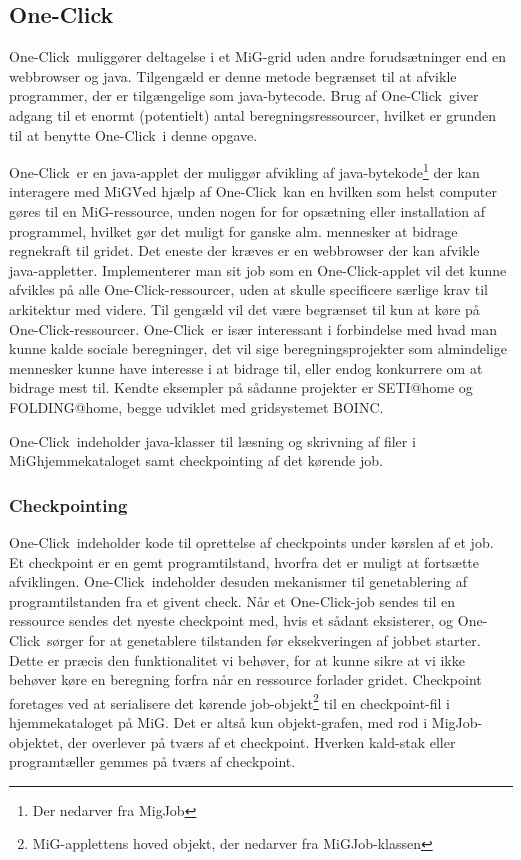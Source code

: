 \documentclass[pdf,draft,a4paper,11pt]{article}
\newcommand{\mig}{MiG}
\newcommand{\oc}{One-Click}
\begin{document}
\subsection{\oc}\label{applet}
\oc\ muliggører deltagelse i et \mig-grid uden andre forudsætninger end en webbrowser og java. Tilgengæld er denne metode begrænset til at afvikle programmer, der er tilgængelige som java-bytecode. Brug af \oc\ giver adgang til et enormt (potentielt) antal beregningsressourcer, hvilket er grunden til at benytte \oc\ i denne opgave.

\oc\ er en java-applet der muliggør afvikling af java-bytekode\footnote{Der nedarver fra MigJob} der kan interagere med \mig\. Ved hjælp af \oc\ kan en hvilken som helst computer gøres til en \mig-ressource, unden nogen for for opsætning eller installation af programmel, hvilket gør det muligt for ganske alm. mennesker at bidrage regnekraft til gridet. Det eneste der kræves er en webbrowser der kan afvikle java-appletter. Implementerer man sit job som en \oc-applet vil det kunne afvikles på alle \oc-ressourcer, uden at skulle specificere særlige krav til arkitektur med videre. Til gengæld vil det være begrænset til kun at køre på \oc-ressourcer. 
\oc\ er især interessant i forbindelse med hvad man kunne kalde sociale beregninger, det vil sige beregningsprojekter som almindelige mennesker kunne have interesse i at bidrage til, eller endog konkurrere om at bidrage mest til. Kendte eksempler på sådanne projekter er SETI@home og FOLDING@home, begge udviklet med gridsystemet BOINC\cite{boinc}.

\oc\ indeholder java-klasser til læsning og skrivning af filer i \mig\-hjemmekataloget samt checkpointing af det kørende job. 

\subsubsection{Checkpointing}
\oc\ indeholder kode til oprettelse af checkpoints under kørslen af et job. Et checkpoint er en gemt programtilstand, hvorfra det er muligt at fortsætte afviklingen. \oc\ indeholder desuden mekanismer til genetablering af programtilstanden fra et givent check. Når et \oc-job sendes til en ressource sendes det nyeste checkpoint med, hvis et sådant eksisterer, og \oc\ sørger for at genetablere tilstanden før eksekveringen af jobbet starter. Dette er præcis den funktionalitet vi behøver, for at kunne sikre at vi ikke behøver køre en beregning forfra når en ressource forlader gridet.
Checkpoint foretages ved at serialisere det kørende job-objekt\footnote{\mig-applettens hoved objekt, der nedarver fra MiGJob-klassen} til en checkpoint-fil i hjemmekataloget på \mig. Det er altså kun objekt-grafen, med rod i MigJob-objektet, der overlever på tværs af et checkpoint. Hverken kald-stak eller programtæller gemmes på tværs af checkpoint.
\end{document}
